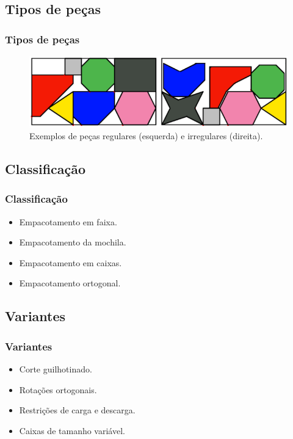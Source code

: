 \documentclass[12pt]{beamer}
\begin{document}
    \subsection{Tipos de peças}\label{subsec:tipos-de-pecas}
    \begin{frame}
        \frametitle{Tipos de peças}
        \begin{figure}[!htb]
            \centering
            \includegraphics[scale=0.6]{utils/images/pieces-example}
            \caption{Exemplos de peças regulares (esquerda) e irregulares (direita).}
            \label{fig:pieces}
        \end{figure}
    \end{frame}

    \subsection{Classificação}\label{subsec:classificacao}
    \begin{frame}
        \frametitle{Classificação}
        \begin{itemize}
            \item Empacotamento em faixa.
            \item Empacotamento da mochila.
            \item Empacotamento em caixas.
            \item Empacotamento ortogonal.
        \end{itemize}
    \end{frame}

    \subsection{Variantes}\label{subsec:variantes}
    \begin{frame}
        \frametitle{Variantes}
        \begin{itemize}
            \item Corte guilhotinado.
            \item Rotações ortogonais.
            \item Restrições de carga e descarga.
            \item Caixas de tamanho variável.
        \end{itemize}
    \end{frame}
\end{document}
